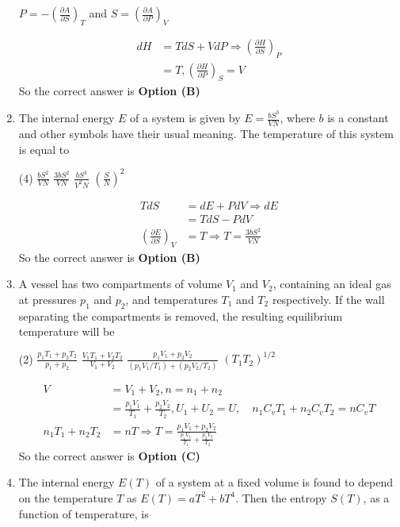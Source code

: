 \begin{enumerate}
\begin{tasks}
	\task[\textbf{D.}] $P=-\left(\frac{\partial A}{\partial S}\right)_{T}$ and $S=\left(\frac{\partial A}{\partial P}\right)_{V}$
\end{tasks}
\begin{answer}
	$$\begin{aligned}	
	d H&=T d S+V d P \Rightarrow\left(\frac{\partial H}{\partial S}\right)_{P}\\&=T,\left(\frac{\partial H}{\partial P}\right)_{S}=V
	\end{aligned}$$	
	So the correct answer is \textbf{Option (B)}
\end{answer}
\item The internal energy $E$ of a system is given by $E=\frac{b S^{3}}{V N}$, where $b$ is a constant and other symbols have their usual meaning. The temperature of this system is equal to

\begin{tasks}(4)
\task[\textbf{A.}] $\frac{b S^{2}}{V N}$
\task[\textbf{B.}] $\frac{3 b S^{2}}{V N}$
\task[\textbf{C.}]  $\frac{b S^{3}}{V^{2} N}$
\task[\textbf{D.}] $\left(\frac{S}{N}\right)^{2}$
\end{tasks}
\begin{answer}
$$\begin{aligned}	
T d S&=d E+P d V \Rightarrow d E\\&=T d S-P d V \\\left(\frac{\partial E}{\partial S}\right)_{V}&=T \Rightarrow T=\frac{3 b S^{2}}{V N}
\end{aligned}$$	
So the correct answer is \textbf{Option (B)}
\end{answer}
\item A vessel has two compartments of volume $V_{1}$ and $V_{2}$, containing an ideal gas at pressures $p_{1}$ and $p_{2}$, and temperatures $T_{1}$ and $T_{2}$ respectively. If the wall separating the compartments is removed, the resulting equilibrium temperature will be

\begin{tasks}(2)
\task[\textbf{A.}] $\frac{p_{1} T_{1}+p_{2} T_{2}}{p_{1}+p_{2}}$
\task[\textbf{B.}]  $\frac{V_{1} T_{1}+V_{2} T_{2}}{V_{1}+V_{2}}$
\task[\textbf{C.}] $\frac{p_{1} V_{1}+p_{2} V_{2}}{\left(p_{1} V_{1} / T_{1}\right)+\left(p_{2} V_{2} / T_{2}\right)}$
\task[\textbf{D.}] $\left(T_{1} T_{2}\right)^{1 / 2}$
\end{tasks}
\begin{answer}
$$\begin{aligned}	
V&=V_{1}+V_{2}, n=n_{1}+n_{2}\\&=\frac{p_{1} V_{1}}{T_{1}}+\frac{p_{2} V_{2}}{T_{2}}, U_{1}+U_{2}=U, \quad n_{1} C_{v} T_{1}+n_{2} C_{v} T_{2}=n C_{v} T\\
n_{1} T_{1}+n_{2} T_{2}&=n T \Rightarrow T=\frac{p_{1} V_{1}+p_{2} V_{2}}{\frac{p_{1} V_{1}}{T_{1}}+\frac{p_{2} V_{2}}{T_{2}}}
\end{aligned}$$	
So the correct answer is \textbf{Option (C)}
\end{answer}
\item The internal energy $E(T)$ of a system at a fixed volume is found to depend on the temperature $T$ as $E(T)=a T^{2}+b T^{4}$. Then the entropy $S(T)$, as a function of temperature, is


\end{enumerate}
